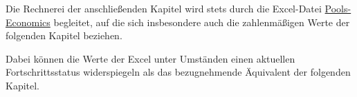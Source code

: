 
Die Rechnerei der anschließenden Kapitel wird stets durch die Excel-Datei \href{pool-economics-V3.xlsx}{Pools-Economics} begleitet, auf die sich insbesondere auch die zahlenmäßigen Werte der folgenden Kapitel beziehen.

\vspace{0.2cm}

Dabei können die Werte der Excel unter Umständen einen aktuellen Fortschrittsstatus widerspiegeln als das bezugnehmende Äquivalent der folgenden Kapitel.